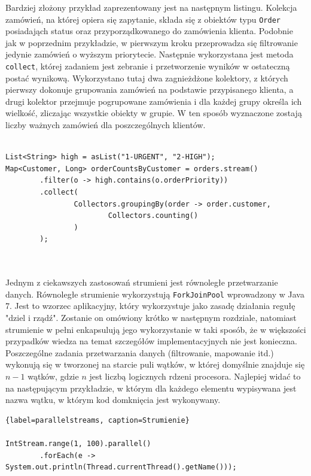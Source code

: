 \documentclass[12pt]{extarticle}
\begin{document}
    Bardziej złożony przykład zaprezentowany jest na następnym listingu. Kolekcja zamówień, na której opiera się zapytanie, składa się z obiektów typu \texttt{Order} posiadająch status oraz przyporządkowanego do zamówienia klienta. Podobnie jak w poprzednim przykładzie, w pierwszym kroku przeprowadza się filtrowanie jedynie zamówień o wyższym priorytecie. Następnie wykorzystana jest metoda \texttt{collect}, której zadaniem jest zebranie i przetworzenie wyników w ostateczną postać wynikową. Wykorzystano tutaj dwa zagnieżdżone kolektory, z których pierwszy dokonuje grupowania zamówień na podstawie przypisanego klienta, a drugi kolektor przejmuje pogrupowane zamówienia i dla każdej grupy określa ich wielkość, zliczając wszystkie obiekty w grupie. W ten sposób wyznaczone zostają liczby ważnych zamówień dla poszczególnych klientów.

\begin{lstlisting}[label=advanced, caption=Zaawansowane wykorzystanie Stream API]

List<String> high = asList("1-URGENT", "2-HIGH");
Map<Customer, Long> orderCountsByCustomer = orders.stream()
        .filter(o -> high.contains(o.orderPriority))
        .collect(
                Collectors.groupingBy(order -> order.customer,
                        Collectors.counting()
                )
        );
        
        

\end{lstlisting}

    Jednym z ciekawszych zastosowań strumieni jest równoległe przetwarzanie danych. Równoległe strumienie wykorzystują \texttt{ForkJoinPool} wprowadzony w Java 7. Jest to wzorzec aplikacyjny, który wykorzystuje jako zasadę działania regułę "dziel i rządź". Zostanie on omówiony krótko w następnym rozdziale, natomiast strumienie w pełni enkapsulują jego wykorzystanie w taki sposób, że w większości przypadków wiedza na temat szczegółów implementacyjnych nie jest konieczna. Poszczególne zadania przetwarzania danych (filtrowanie, mapowanie itd.) wykonują się w tworzonej na starcie puli wątków, w której domyślnie znajduje się $ n-1 $ wątków, gdzie $ n $ jest liczbą logicznych rdzeni procesora. Najlepiej widać to na następującym przykładzie, w którym dla każdego elementu wypisywana jest nazwa wątku, w którym kod domknięcia jest wykonywany.

\begin{lstlisting}{label=parallelstreams, caption=Strumienie}

IntStream.range(1, 100).parallel()
        .forEach(e -> System.out.println(Thread.currentThread().getName()));

\end{lstlisting}
\end{document}
